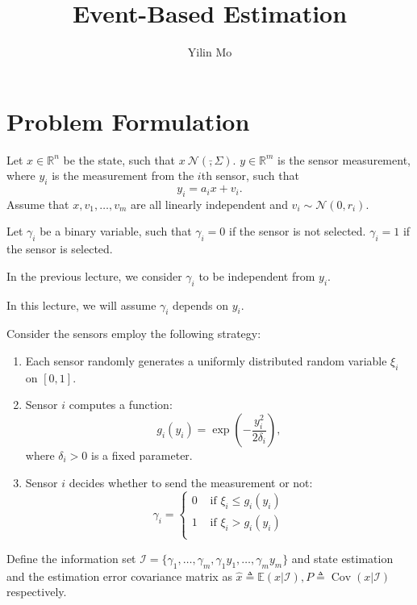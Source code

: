 \documentclass{article}
\title{Event-Based Estimation}
\author{Yilin Mo}
\DeclareMathOperator{\Cov}{Cov}
\begin{document}
 \maketitle

\section{Problem Formulation}
Let $x\in \mathbb R^n$ be the state, such that $x~\mathcal N(\bar,\Sigma)$. $y\in \mathbb R^m$ is the sensor measurement, where $y_i$ is the measurement from the $i$th sensor, such that
\begin{displaymath}
 y_i = a_i x + v_i.
\end{displaymath}
Assume that $x,v_1,\dots,v_m$ are all linearly independent and $v_i\sim \mathcal N(0,r_i)$. 

Let $\gamma_i$ be a binary variable, such that $\gamma_i = 0$ if the sensor is not selected. $\gamma_i = 1$ if the sensor is selected.

In the previous lecture, we consider $\gamma_i$ to be independent from $y_i$. 

In this lecture, we will assume $\gamma_i$ depends on $y_i$.

Consider the sensors employ the following strategy:
\begin{enumerate}
  \item Each sensor randomly generates a uniformly distributed random variable $\xi_i$ on $[0,1]$.  
  \item Sensor $i$ computes a function:
    \begin{displaymath}
      g_i(y_i) =\exp\left( -\frac{y_i^2}{2\delta_i} \right),
    \end{displaymath}
    where $\delta_i>0$ is a fixed parameter.
  \item Sensor $i$ decides whether to send the measurement or not:
    \begin{displaymath}
      \gamma_i = \begin{cases}
	0&\text{ if }\xi_i\leq g_i(y_i)\\
	1&\text{ if }\xi_i> g_i(y_i)\\
      \end{cases}
    \end{displaymath}
\end{enumerate}

Define the information set $\mathcal I = \{\gamma_1,\dots,\gamma_m,\gamma_1y_1,\dots,\gamma_my_m\}$ and state estimation and the estimation error covariance matrix as $\hat x \triangleq \mathbb E(x|\mathcal I),P \triangleq \Cov(x|\mathcal I)$ respectively.
\end{document}
